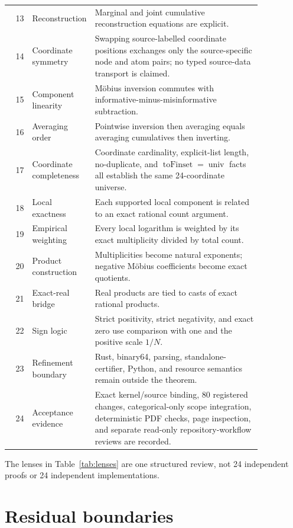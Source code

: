 \documentclass[11pt]{article}
\theoremstyle{definition}
\begin{document}
\begin{longtable}{@{}rL{0.19\linewidth}L{0.66\linewidth}@{}}
13 & Reconstruction & Marginal and joint cumulative reconstruction equations are explicit. \\
14 & Coordinate symmetry & Swapping source-labelled coordinate positions exchanges only the
source-specific node and atom pairs; no typed source-data transport is claimed. \\
15 & Component linearity & M\"obius inversion commutes with informative-minus-misinformative
subtraction. \\
16 & Averaging order & Pointwise inversion then averaging equals averaging cumulatives then
inverting. \\
17 & Coordinate completeness & Coordinate cardinality, explicit-list length, no-duplicate, and
\(
\operatorname{toFinset}=\operatorname{univ}
\) facts all establish the same 24-coordinate universe. \\
18 & Local exactness & Each supported local component is related to an exact rational count
argument. \\
19 & Empirical weighting & Every local logarithm is weighted by its exact multiplicity divided by
total count. \\
20 & Product construction & Multiplicities become natural exponents; negative M\"obius
coefficients become exact quotients. \\
21 & Exact-real bridge & Real products are tied to casts of exact rational products. \\
22 & Sign logic & Strict positivity, strict negativity, and exact zero use comparison with one and
the positive scale \(1/N\). \\
23 & Refinement boundary & Rust, binary64, parsing, standalone-certifier, Python, and resource
semantics remain outside the theorem. \\
24 & Acceptance evidence & Exact kernel/source binding, 80 registered changes, categorical-only
scope integration, deterministic PDF checks, page inspection, and separate read-only
repository-workflow reviews are recorded. \\
\bottomrule
\end{longtable}

The lenses in Table~\ref{tab:lenses} are one structured review, not 24 independent proofs or 24
independent implementations.

\section{Residual boundaries}
\end{document}
